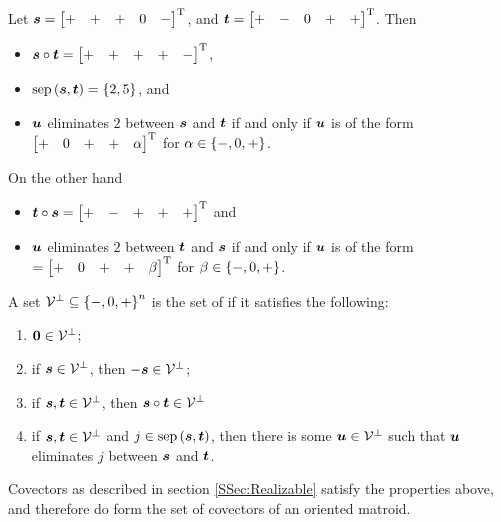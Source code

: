         \begin{Example}\label{Ex:OrientedOps}
            Let \(\bm{s}={\begin{bmatrix}+ & + & + & 0 & -\end{bmatrix}}^{\mathrm{T}}\), and \(\bm{t}={\begin{bmatrix}+ & - & 0 & + & +\end{bmatrix}}^{\mathrm{T}}\).  Then
                \begin{itemize}
                    \item   \(\bm{s}\circ\bm{t}={\begin{bmatrix}+ & + & + & + & -\end{bmatrix}}^{\mathrm{T}}\),
                    \item   \(\operatorname{sep}\left(\bm{s},\bm{t}\right)=\left\{2,5\right\}\), and
                    \item   \(\bm{u}\) eliminates \(2\) between \(\bm{s}\) and \(\bm{t}\) if and only if \(\bm{u}\) is of the form \({\begin{bmatrix}+ & 0 & + & + & \alpha\end{bmatrix}}^{\mathrm{T}}\) for \(\alpha\in\left\{-,0,+\right\}\).
                \end{itemize}

            On the other hand
                \begin{itemize}
                    \item   \(\bm{t}\circ\bm{s}={\begin{bmatrix}+ & - & + & + & +\end{bmatrix}}^{\mathrm{T}}\) and
                    \item   \(\bm{u}\) eliminates \(2\) between \(\bm{t}\) and \(\bm{s}\) if and only if \(\bm{u}\) is of the form \(={\begin{bmatrix}+ & 0 & + & + & \beta\end{bmatrix}}^{\mathrm{T}}\) for \(\beta\in\left\{-,0,+\right\}\).
                \end{itemize}
        \end{Example}

        \begin{Definition}
            A set \(\mathcal{V}^\perp\subseteq\left\{-,0,+\right\}^n\) is the set of  if it satisfies the following:
                \begin{enumerate}
                    \item   \(\bm{0}\in\mathcal{V}^\perp\);
                    \item   if \(\bm{s}\in\mathcal{V}^\perp\), then \(-\bm{s}\in\mathcal{V}^\perp\);
                    \item   if \(\bm{s},\bm{t}\in\mathcal{V}^\perp\), then \(\bm{s}\circ\bm{t}\in\mathcal{V}^\perp\)
                    \item   if \(\bm{s},\bm{t}\in\mathcal{V}^\perp\) and \(j\in\operatorname{sep}\left(\bm{s},\bm{t}\right)\), then there is some \(\bm{u}\in\mathcal{V}^\perp\) such that \(\bm{u}\) eliminates \(j\) between \(\bm{s}\) and \(\bm{t}\).
                \end{enumerate}
        \end{Definition}

        Covectors as described in section \ref{SSec:Realizable} satisfy the properties above, and therefore do form the set of covectors of an oriented matroid.


